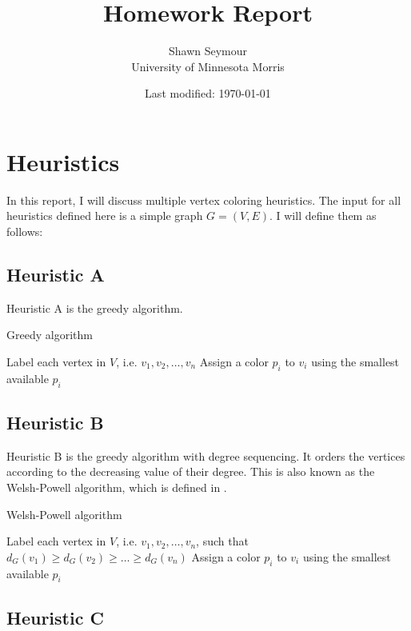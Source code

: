 \documentclass{article}
\title{Homework Report}
\date{Last modified: \today}
\author{Shawn Seymour\\ University of Minnesota Morris}
\begin{document}
\maketitle

\section*{Heuristics}
In this report, I will discuss multiple vertex coloring heuristics. The input for all heuristics defined here is a simple graph \(G = (V, E)\). I will define them as follows:

\subsection*{Heuristic A}

Heuristic A is the greedy algorithm.

\begin{algorithm}
\caption{Greedy algorithm}
\begin{algorithmic}[1]
\State Label each vertex in $V$, i.e. $v_1, v_2, \dots, v_n$
\State Assign a color $p_i$ to $v_i$ using the smallest available $p_i$
\EndFor
\end{algorithmic}
\end{algorithm}

\subsection*{Heuristic B}

Heuristic B is the greedy algorithm with degree sequencing. It orders the vertices according to the decreasing value of their degree. This is also known as the Welsh-Powell algorithm, which is defined in \cite{welsh}.

\begin{algorithm}
\caption{Welsh-Powell algorithm}
\begin{algorithmic}[1]
\State Label each vertex in $V$, i.e. $v_1, v_2, \dots, v_n$, such that $d_G(v_1) \geq d_G(v_2) \geq \dots \geq d_G(v_n)$
\State Assign a color $p_i$ to $v_i$ using the smallest available $p_i$
\EndFor
\end{algorithmic}
\end{algorithm}

\subsection*{Heuristic C}
\end{document}
